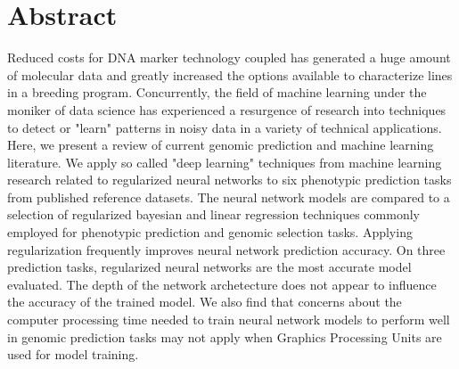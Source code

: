 \chapter*{Abstract}

Reduced costs for DNA marker technology coupled has generated a huge amount of
molecular data and greatly increased the options available to characterize lines 
in a breeding program. Concurrently, the field of machine learning under
the moniker of data science has experienced a resurgence of research into 
techniques to detect or "learn" patterns in noisy data in a variety of 
technical applications. Here, we present a review of current genomic prediction 
and machine learning literature. We apply so called "deep learning"
techniques from machine learning research related to regularized neural networks to six 
phenotypic prediction tasks from published reference datasets. 
The neural network models are compared to a selection of regularized bayesian 
and linear regression techniques commonly employed for phenotypic prediction and genomic
selection tasks. Applying regularization frequently improves neural network 
prediction accuracy. On three prediction tasks, regularized neural networks 
are the most accurate model evaluated. The depth of the network archetecture
does not appear to influence the accuracy of the trained model. We also find
that concerns about the computer processing time needed to train neural network 
models to perform well in genomic prediction tasks may not apply when Graphics
Processing Units are used for model training.



